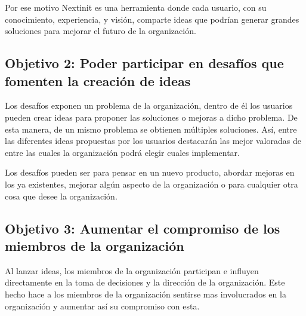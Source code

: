 Por ese motivo Nextinit es una herramienta donde cada usuario, con su conocimiento, experiencia, y
visión, comparte ideas que podrían generar grandes soluciones para mejorar el futuro de la organización.

\subsection{Objetivo 2: Poder participar en desafíos que fomenten la creación de ideas}
Los desafíos exponen un problema de la organización, dentro de él los usuarios pueden crear ideas para
proponer las soluciones o mejoras a dicho problema. De esta manera, de un mismo problema se obtienen múltiples
 soluciones. Así, entre las diferentes ideas propuestas por los usuarios destacarán las mejor valoradas de
 entre las cuales la organización podrá elegir cuales implementar.
 
Los desafíos pueden ser para pensar en un nuevo producto, abordar mejoras en los ya existentes, mejorar
 algún aspecto de la organización o para cualquier otra cosa que desee la organización.


\subsection{Objetivo 3: Aumentar el compromiso de los miembros de la organización}

Al lanzar ideas, los miembros de la organización participan e influyen directamente en la toma de 
decisiones y la dirección de la organización. Este hecho hace a los miembros de la organización sentirse
mas involucrados en la organización y aumentar así su compromiso con esta.


